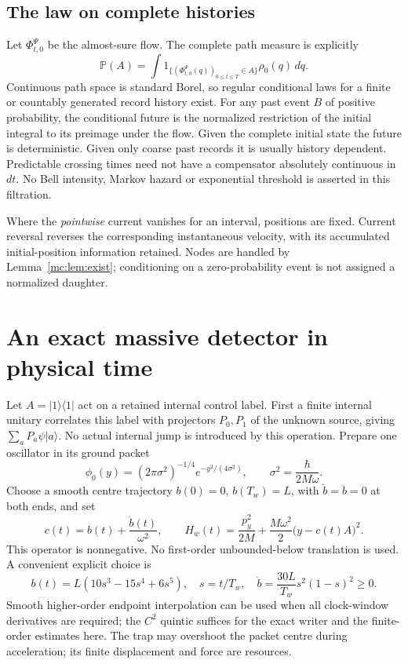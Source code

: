 \documentclass[11pt,oneside,openany]{book}
\theoremstyle{definition}
\theoremstyle{remark}\newtheorem{remark}[theorem]{Remark}
\providecommand{\Prb}{\mathbb P}
\providecommand{\ket}[1]{\lvert#1\rangle}
\providecommand{\bra}[1]{\langle#1\rvert}
\begin{document}
\subsection{The law on complete histories}
Let $\Phi_{t,0}^\Psi$ be the almost-sure flow. The complete path measure is explicitly
\begin{equation}\label{mc:eq:pathlaw}
 \Prb(A)=\int 1_{\{(\Phi_{t,0}^\Psi(q))_{0\le t\le T}\in A\}}
                   \rho_0(q)\,dq .
\end{equation}
Continuous path space is standard Borel, so regular conditional laws for a finite or countably generated record history exist. For any past event $B$ of positive probability, the conditional future is the normalized restriction of the initial integral to its preimage under the flow. Given the complete initial state the future is deterministic. Given only coarse past records it is usually history dependent. Predictable crossing times need not have a compensator absolutely continuous in $dt$. No Bell intensity, Markov hazard or exponential threshold is asserted in this filtration.

Where the \emph{pointwise} current vanishes for an interval, positions are fixed. Current reversal reverses the corresponding instantaneous velocity, with its accumulated initial-position information retained. Nodes are handled by Lemma~\ref{mc:lem:exist}; conditioning on a zero-probability event is not assigned a normalized daughter.

\section{An exact massive detector in physical time}
\label{mc:sec:detector}
Let $A=\ket{1}\bra{1}$ act on a retained internal control label. First a finite internal unitary correlates this label with projectors $P_0,P_1$ of the unknown source, giving $\sum_a P_a\psi\ket a$. No actual internal jump is introduced by this operation. Prepare one oscillator in its ground packet
\[
 \phi_0(y)=(2\pi\sigma^2)^{-1/4}e^{-y^2/(4\sigma^2)},\qquad
 \sigma^2=\frac{\hbar}{2M\omega}.
\]
Choose a smooth centre trajectory $b(0)=0$, $b(T_w)=L$, with $\dot b=\ddot b=0$ at both ends, and set
\begin{equation}\label{mc:eq:force}
 c(t)=b(t)+\frac{\ddot b(t)}{\omega^2},\qquad
 H_w(t)=\frac{p_y^2}{2M}+\frac{M\omega^2}{2}\bigl(y-c(t)A\bigr)^2.
\end{equation}
This operator is nonnegative. No first-order unbounded-below translation is used. A convenient explicit choice is
\begin{equation}\label{mc:eq:quintic}
 b(t)=L(10s^3-15s^4+6s^5),\quad s=t/T_w,\quad
 \dot b=\frac{30L}{T_w}s^2(1-s)^2\ge0.
\end{equation}
Smooth higher-order endpoint interpolation can be used when all clock-window derivatives are required; the $C^2$ quintic suffices for the exact writer and the finite-order estimates here. The trap may overshoot the packet centre during acceleration; its finite displacement and force are resources.
\end{document}
